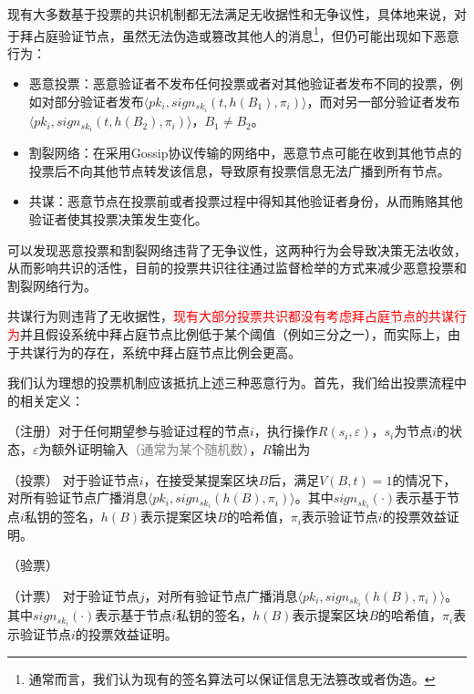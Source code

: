 现有大多数基于投票的共识机制都无法满足无收据性和无争议性，具体地来说，对于拜占庭验证节点，虽然无法伪造或篡改其他人的消息\footnote{通常而言，我们认为现有的签名算法可以保证信息无法篡改或者伪造。}，但仍可能出现如下恶意行为：

\begin{itemize}
	\item 恶意投票：恶意验证者不发布任何投票或者对其他验证者发布不同的投票，例如对部分验证者发布$\langle pk_i,sign_{sk_i}(t,h(B_1),\pi_i) \rangle$，而对另一部分验证者发布$\langle pk_i,sign_{sk_i}(t,h(B_2),\pi_i) \rangle$，$B_1 \neq B_2$。
	\item 割裂网络：在采用Gossip协议传输的网络中，恶意节点可能在收到其他节点的投票后不向其他节点转发该信息，导致原有投票信息无法广播到所有节点。
	\item 共谋：恶意节点在投票前或者投票过程中得知其他验证者身份，从而贿赂其他验证者使其投票决策发生变化。
\end{itemize}

可以发现恶意投票和割裂网络违背了无争议性，这两种行为会导致决策无法收敛，从而影响共识的活性，目前的投票共识往往通过监督检举的方式来减少恶意投票和割裂网络行为\cite{buterin2017casper}。

共谋行为则违背了无收据性，\textcolor{red}{现有大部分投票共识都没有考虑拜占庭节点的共谋行为}并且假设系统中拜占庭节点比例低于某个阈值（例如三分之一），而实际上，由于共谋行为的存在，系统中拜占庭节点比例会更高。

我们认为理想的投票机制应该抵抗上述三种恶意行为。首先，我们给出投票流程中的相关定义：

\begin{definition}
	（注册）对于任何期望参与验证过程的节点$i$，执行操作$R(s_i,\varepsilon)$，$s_i$为节点$i$的状态，$\varepsilon$为额外证明输入\textcolor{gray}{（通常为某个随机数）}，$R$输出为
\end{definition}

\begin{definition}
（投票） 对于验证节点$i$，在接受某提案区块$B$后，满足$V(B,t)=1$的情况下，对所有验证节点广播消息$\langle pk_i,sign_{sk_i}(h(B),\pi_i) \rangle$。其中$sign_{sk_i}(\cdot)$表示基于节点$i$私钥的签名，$h(B)$表示提案区块$B$的哈希值，$\pi_i$表示验证节点$i$的投票效益证明。
\end{definition}

\begin{definition}
	（验票）
\end{definition}

\begin{definition}
（计票） 对于验证节点$j$，对所有验证节点广播消息$\langle pk_i,sign_{sk_i}(h(B),\pi_i) \rangle$。其中$sign_{sk_i}(\cdot)$表示基于节点$i$私钥的签名，$h(B)$表示提案区块$B$的哈希值，$\pi_i$表示验证节点$i$的投票效益证明。
\end{definition}


